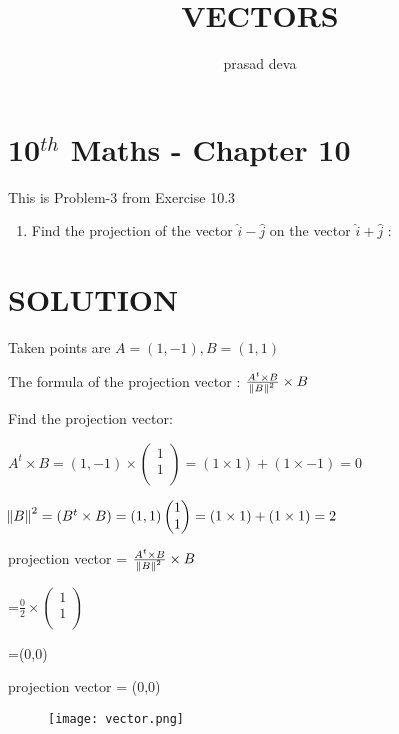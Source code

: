\documentclass[10pt]{article}
\title{VECTORS}
\author{prasad deva}
\begin{document}
\maketitle


\section{10$^{th}$ Maths - Chapter 10}

This is Problem-3 from Exercise 10.3

\begin{enumerate}
\item Find the projection of the vector $\hat{i}-\hat{j}$ on the vector $\hat{i}+\hat{j}$  :
\end{enumerate}
\section{SOLUTION}
Taken points are $A=(1,-1), B=(1, 1)$  
\bigskip

The formula of the projection vector : $\frac{A^t\times B}{\norm B^2}\times B$
\bigskip

Find the projection vector:
\bigskip

$A^t\times B = (1, -1)\times \left(\begin{matrix}
1\\
1\\
\end{matrix}\right)  = (1\times1)+(1\times-1)=0$
\bigskip

$\norm B^2 = (B^t\times B)=(1,1)\left(\begin{matrix}
1\\
1\\
\end{matrix}\right)= (1\times1)+(1\times1)=2$
 \bigskip
 
projection vector = $\frac{A^t\times B}{\norm B^2}\times B$
\bigskip

   =$\frac{0}{2}\times \left(\begin{matrix}
   1\\
   1\\
   \end{matrix}\right)$
  \bigskip

    =(0,0)
\bigskip

projection vector = (0,0)

\begin{figure}[h]
  \centering
  \texttt{[image: vector.png]}
\caption{}
\end{figure}
\end{document}
